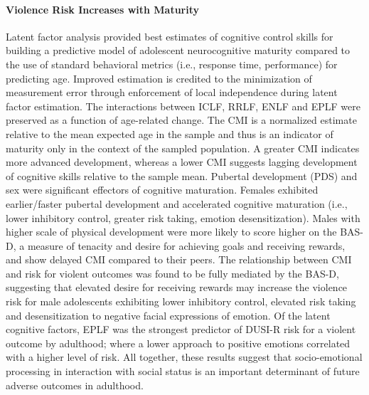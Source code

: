 \documentclass[utf8]{stylesheet}
\begin{document}
\paragraph*{Violence Risk Increases with Maturity}
Latent factor analysis provided best estimates of cognitive control skills for building a predictive model of adolescent neurocognitive maturity compared to the use of standard behavioral metrics (i.e., response time, performance) for predicting age. Improved estimation is credited to the minimization of measurement error through enforcement of local independence during latent factor estimation. The interactions between ICLF, RRLF, ENLF and EPLF were preserved as a function of age-related change. The CMI is a normalized estimate relative to the mean expected age in the sample and thus is an indicator of maturity only in the context of the sampled population. A greater CMI indicates more advanced development, whereas a lower CMI suggests lagging development of cognitive skills relative to the sample mean. Pubertal development (PDS) and sex were significant effectors of cognitive maturation. Females exhibited earlier/faster pubertal development and accelerated cognitive maturation (i.e., lower inhibitory control, greater risk taking, emotion desensitization). Males with higher scale of physical development were more likely to score higher on the BAS-D, a measure of tenacity and desire for achieving goals and receiving rewards, and show delayed CMI compared to their peers. The relationship between CMI and risk for violent outcomes was found to be fully mediated by the BAS-D, suggesting that elevated desire for receiving rewards may increase the violence risk for male adolescents exhibiting lower inhibitory control, elevated risk taking and desensitization to negative facial expressions of emotion. Of the latent cognitive factors, EPLF was the strongest predictor of DUSI-R risk for a violent outcome by adulthood; where a lower approach to positive emotions correlated with a higher level of risk. All together, these results suggest that socio-emotional processing in interaction with social status is an important determinant of future adverse outcomes in adulthood. 
\vspace{2pt}
\end{document}
